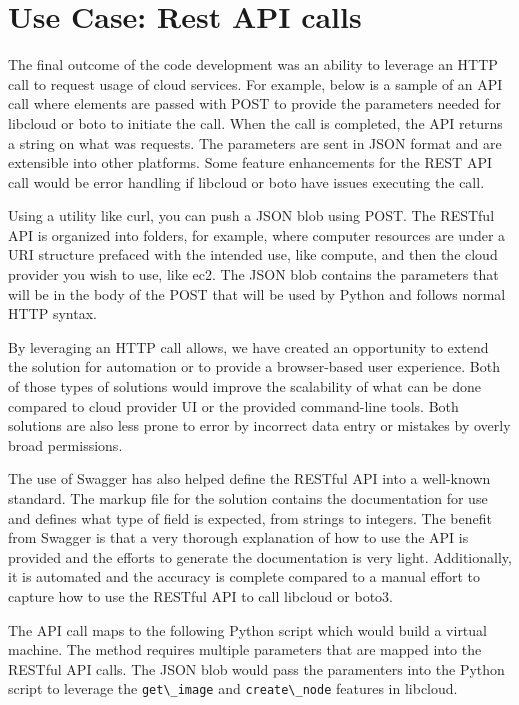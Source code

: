 \section{Use Case: Rest API calls}

The final outcome of the code development was an ability to leverage an HTTP
call to request usage of cloud services. For example, below is a sample of an
API call where elements are passed with POST to provide the parameters needed
for libcloud or boto to initiate the call. When the call is completed, the API
returns a string on what was requests. The parameters are sent in JSON format
and are extensible into other platforms. Some feature enhancements for the REST
API call would be error handling if libcloud or boto have issues executing the
call.  

Using a utility like curl, you can push a JSON blob using POST. The RESTful API
is organized into folders, for example, where computer resources are under a
URI
structure prefaced with the intended use, like compute, and then the cloud
provider you wish to use, like ec2. The JSON blob contains the parameters that
will be in the body of the POST that will be used by Python and follows normal
HTTP syntax.

By leveraging an HTTP call allows, we have created an opportunity to extend the
solution for automation or to provide a browser-based user experience. Both of
those types of solutions would improve the scalability of what can be done
compared to cloud provider UI or the provided command-line tools. Both
solutions
are also less prone to error by incorrect data entry or mistakes by overly
broad
permissions. 

The use of Swagger has also helped define the RESTful API into a well-known
standard. The markup file for the solution contains the documentation for use
and defines what type of field is expected, from strings to integers. The
benefit from Swagger is that a very thorough explanation of how to use the API
is provided and the efforts to generate the documentation is very light.
Additionally, it is automated and the accuracy is complete compared to a manual
effort to capture how to use the RESTful API to call libcloud or boto3.

The API call maps to the following Python script which would build a virtual
machine. The method requires multiple parameters that are mapped into the
RESTful API calls. The JSON blob would pass the paramenters into the Python
script to leverage the \verb|get\_image| and \verb|create\_node| features in
libcloud.

